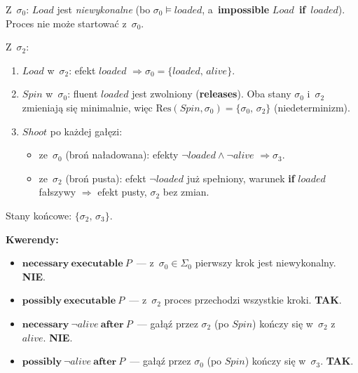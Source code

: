 \documentclass[11pt,a4paper]{article}
\newcommand{\aft}{\textbf{after}}
\renewcommand{\iff}{\textbf{if}}
\newcommand{\impossible}{\textbf{impossible}}
\newcommand{\releases}{\textbf{releases}}
\newcommand{\necessary}{\textbf{necessary}}
\newcommand{\possibly}{\textbf{possibly}}
\newcommand{\executable}{\textbf{executable}}
\theoremstyle{definition}
\begin{document}
\smallskip
Z~$\sigma_0$: $\mathit{Load}$ jest \emph{niewykonalne}
(bo $\sigma_0 \models \mathit{loaded}$, a~\impossible{} $\mathit{Load}$~\iff{}~$\mathit{loaded}$).
Proces nie może startować z~$\sigma_0$.

\smallskip\noindent
Z~$\sigma_2$:
\begin{enumerate}
  \item $\mathit{Load}$ w~$\sigma_2$: efekt $\mathit{loaded}$
        $\Rightarrow \sigma_0 = \{\mathit{loaded},\,\mathit{alive}\}$.
  \item $\mathit{Spin}$ w~$\sigma_0$: fluent $\mathit{loaded}$ jest zwolniony
        (\releases{}).
        Oba stany $\sigma_0$ i~$\sigma_2$ zmieniają się minimalnie,
        więc $\mathrm{Res}(\mathit{Spin}, \sigma_0) = \{\sigma_0,\, \sigma_2\}$
        (niedeterminizm).
  \item $\mathit{Shoot}$ po każdej gałęzi:
    \begin{itemize}
      \item ze~$\sigma_0$ (broń naładowana):
            efekty $\neg\mathit{loaded} \land \neg\mathit{alive}$
            $\Rightarrow \sigma_3$.
      \item ze~$\sigma_2$ (broń pusta):
            efekt $\neg\mathit{loaded}$ już spełniony,
            warunek \iff{} $\mathit{loaded}$ fałszywy
            $\Rightarrow$ efekt pusty, $\sigma_2$ bez zmian.
    \end{itemize}
\end{enumerate}

Stany końcowe: $\{\sigma_2,\, \sigma_3\}$.

\medskip
\noindent\textbf{Kwerendy:}
\begin{itemize}
  \item $\necessary\ \executable\ P$~---
    z~$\sigma_0 \in \Sigma_0$ pierwszy krok jest niewykonalny.
    \textbf{NIE}.

  \item $\possibly\ \executable\ P$~---
    z~$\sigma_2$ proces przechodzi wszystkie kroki.
    \textbf{TAK}.

  \item $\necessary\ \neg\mathit{alive}\ \aft\ P$~---
    gałąź przez $\sigma_2$ (po $\mathit{Spin}$) kończy się w~$\sigma_2$
    z~$\mathit{alive}$.
    \textbf{NIE}.

  \item $\possibly\ \neg\mathit{alive}\ \aft\ P$~---
    gałąź przez $\sigma_0$ (po $\mathit{Spin}$) kończy się w~$\sigma_3$.
    \textbf{TAK}.
\end{itemize}
\end{document}
